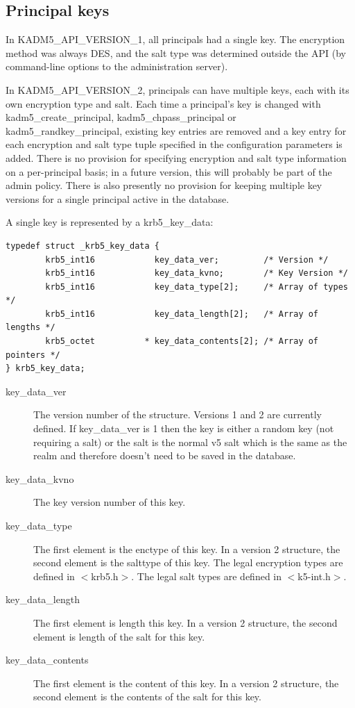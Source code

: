 \subsection{Principal keys}
\label{sec:keys}

In KADM5_API_VERSION_1, all principals had a single key.  The
encryption method was always DES, and the salt type was determined
outside the API (by command-line options to the administration
server).

In KADM5_API_VERSION_2, principals can have multiple keys, each with
its own encryption type and salt.  Each time a principal's key is
changed with kadm5_create_principal, kadm5_chpass_principal or
kadm5_randkey_principal, existing key entries are removed and a key
entry for each encryption and salt type tuple specified in the
configuration parameters is added.  There is no provision for
specifying encryption and salt type information on a per-principal
basis; in a future version, this will probably be part of the admin
policy.  There is also presently no provision for keeping multiple key
versions for a single principal active in the database.

A single key is represented by a krb5_key_data:
%
\begin{verbatim}
typedef struct _krb5_key_data {
        krb5_int16            key_data_ver;         /* Version */
        krb5_int16            key_data_kvno;        /* Key Version */
        krb5_int16            key_data_type[2];     /* Array of types */
        krb5_int16            key_data_length[2];   /* Array of lengths */
        krb5_octet          * key_data_contents[2]; /* Array of pointers */
} krb5_key_data;
\end{verbatim}
%
\begin{description}
\item[key_data_ver] The version number of the structure.  Versions 1
and 2 are currently defined.  If key_data_ver is 1 then the key is
either a random key (not requiring a salt) or the salt is the normal
v5 salt which is the same as the realm and therefore doesn't need to
be saved in the database.

\item[key_data_kvno] The key version number of this key.

\item[key_data_type] The first element is the enctype of this key.  In
a version 2 structure, the second element is the salttype of this key.
The legal encryption types are defined in $<$krb5.h$>$.  The legal
salt types are defined in $<$k5-int.h$>$.

\item[key_data_length] The first element is length this key.  In a
version 2 structure, the second element is length of the salt for this
key.

\item[key_data_contents] The first element is the content of this key.
In a version 2 structure, the second element is the contents of the
salt for this key.
\end{description}

